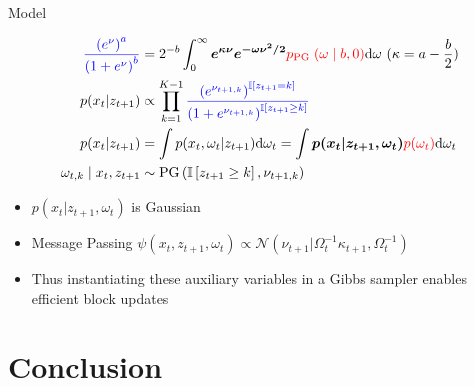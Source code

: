 \documentclass{beamer}
\begin{document}
\begin{frame}{Model}%
        \begin{tcolorbox}[colback=blue!10!white,colframe=blue!50!black,title=Polya-gamma augmentation\cite{linderman2015dependent},boxrule=2pt, boxsep=0.1em, left=0.1em, right=0.1em,
fontupper=\fontsize{8}{10}\selectfont]

\begin{align}
\textcolor{blue}{ \frac{\left(e^{\nu}\right)^{a}}{\left(1+e^{\nu}\right)^{b}} } &=2^{-b}  \int_{0}^{\infty} \boldsymbol{e^{\kappa \nu} e^{-\omega \nu^{2} / 2} }\textcolor{red} {  p_{\text {PG }}(\omega \mid b, 0) }\mathrm{d} \omega \text{ }(\kappa=a-\frac{b}{2})\\
p(x_{t}|z_{t+1}) &\propto \prod_{k=1}^{K-1} \textcolor{blue}{  \frac{\left(e^{\nu_{t+1, k}}\right)^{\mathbb{I}\left[z_{t+1}=k\right]}}{\left(1+e^{\nu_{t+1, k}}\right)^{\mathbb{I}\left[z_{t+1} \geq k\right]}} }\\
p(x_t|z_{t+1})&=\int p(x_t,\omega_t|z_{t+1})  \mathrm{d}\omega_t=\int   \boldsymbol{ p(x_t|z_{t+1},\omega_t) }\textcolor{red}{ p(\omega_t) } \mathrm{d}\omega_t  \\
\omega_{t, k} \mid x_{t}, z_{t+1} &\sim \operatorname{PG}\left(\mathbb{I}\left[z_{t+1} \geq k\right], \nu_{t+1, k}\right) 
\end{align}

\end{tcolorbox}
\begin{itemize}
\item $p(x_t|z_{t+1},\omega_t)$ is Gaussian 
\item Message Passing $\psi(x_t,z_{t+1},\omega_t) \propto \mathcal{N}(\nu_{t+1}|\Omega^{-1}_t \kappa_{t+1},\Omega^{-1}_t)$
\item Thus instantiating these auxiliary variables in a Gibbs
sampler enables efficient block updates
\end{itemize}

    \end{frame}


\section{Conclusion}
\end{document}
